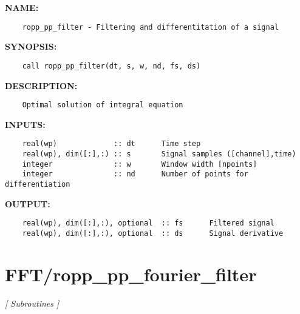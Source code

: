 \label{ch:robo15}
\label{ch:FFT_ropp_pp_filter}
\textbf{NAME:}\hspace{0.08in}\begin{Verbatim}
    ropp_pp_filter - Filtering and differentitation of a signal
\end{Verbatim}
\textbf{SYNOPSIS:}\hspace{0.08in}\begin{Verbatim}
    call ropp_pp_filter(dt, s, w, nd, fs, ds)
\end{Verbatim}
\textbf{DESCRIPTION:}\hspace{0.08in}\begin{Verbatim}
    Optimal solution of integral equation
\end{Verbatim}
\textbf{INPUTS:}\hspace{0.08in}\begin{Verbatim}
    real(wp)             :: dt      Time step
    real(wp), dim([:],:) :: s       Signal samples ([channel],time)
    integer              :: w       Window width [npoints]
    integer              :: nd      Number of points for differentiation 
\end{Verbatim}
\textbf{OUTPUT:}\hspace{0.08in}\begin{Verbatim}
    real(wp), dim([:],:), optional  :: fs      Filtered signal
    real(wp), dim([:],:), optional  :: ds      Signal derivative
\end{Verbatim}
\section{FFT/ropp\_pp\_fourier\_filter}
\textsl{[ Subroutines ]}

